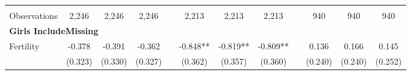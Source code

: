 \begin{landscape}
\begin{table}[htpb!]
\begin{center}
\begin{tabular}{lcccp{2mm}cccp{2mm}ccc}
\begin{footnotesize}\end{footnotesize}&\begin{footnotesize}\end{footnotesize}&\begin{footnotesize}\end{footnotesize}&\begin{footnotesize}\end{footnotesize}&\begin{footnotesize}\end{footnotesize}&\begin{footnotesize}\end{footnotesize}&\begin{footnotesize}\end{footnotesize}&\begin{footnotesize}\end{footnotesize}&\begin{footnotesize}\end{footnotesize}&\begin{footnotesize}\end{footnotesize}&\begin{footnotesize}\end{footnotesize}&\begin{footnotesize}\end{footnotesize}\\Observations&2,246&2,246&2,246&&2,213&2,213&2,213&&940&940&940\\
\multicolumn{12}{l}{\textbf{Girls IncludeMissing}}\\ 
Fertility&-0.378&-0.391&-0.362&&-0.848**&-0.819**&-0.809**&&0.136&0.166&0.145\\
&(0.323)&(0.330)&(0.327)&&(0.362)&(0.357)&(0.360)&&(0.240)&(0.240)&(0.252)\\

\end{tabular}
\end{center}
\end{table}
\end{landscape}
